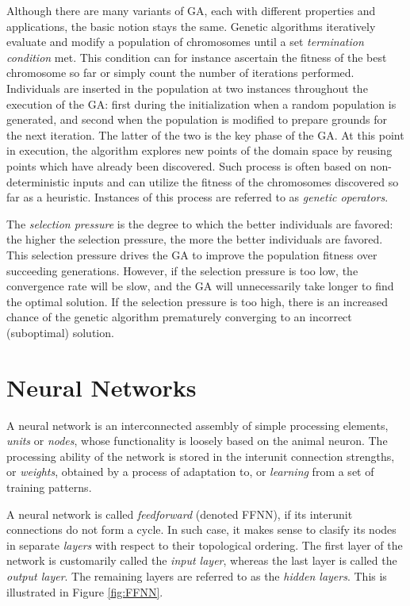 Although there are many variants of GA, each with different properties and applications, the basic notion stays the same. Genetic algorithms iteratively evaluate and modify a population of chromosomes until a set \textit{termination condition} met. This condition can for instance ascertain the fitness of the best chromosome so far or simply count the number of iterations performed. Individuals are inserted in the population at two instances throughout the execution of the GA: first during the initialization when a random population is generated, and second when the population is modified to prepare grounds for the next iteration. The latter of the two is the key phase of the GA. At this point in execution, the algorithm explores new points of the domain space by reusing points which have already been discovered. Such process is often based on non-deterministic inputs and can utilize the fitness of the chromosomes discovered so far as a heuristic. Instances of this process are referred to as \textit{genetic operators}.

The \textit{selection pressure} is the degree to which the better individuals are favored: the higher the selection pressure, the more the better individuals are favored. This selection pressure drives the GA to improve the population fitness over succeeding generations. However, if the selection pressure is too low, the convergence rate will be slow, and the GA will unnecessarily take longer to find the optimal solution. If the selection pressure is too high, there is an increased chance of the genetic algorithm prematurely converging to an incorrect (suboptimal) solution. \cite{GaTournamentSelection}

\section{Neural Networks}\label{section:neural-networks}
A neural network is an interconnected assembly of simple processing elements, \textit{units} or \textit{nodes}, whose functionality is loosely based on the animal neuron. The processing ability of the network is stored in the interunit connection strengths, or \textit{weights}, obtained by a process of adaptation to, or \textit{learning} from a set of training patterns. \cite{NeuralNets}

A neural network is called \textit{feedforward} (denoted FFNN), if its interunit connections do not form a cycle. In such case, it makes sense to clasify its nodes in separate \textit{layers} with respect to their topological ordering. The first layer of the network is customarily called the \textit{input layer}, whereas the last layer is called the \textit{output layer}. The remaining layers are referred to as the \textit{hidden layers}. This is illustrated in Figure \ref{fig:FFNN}.

